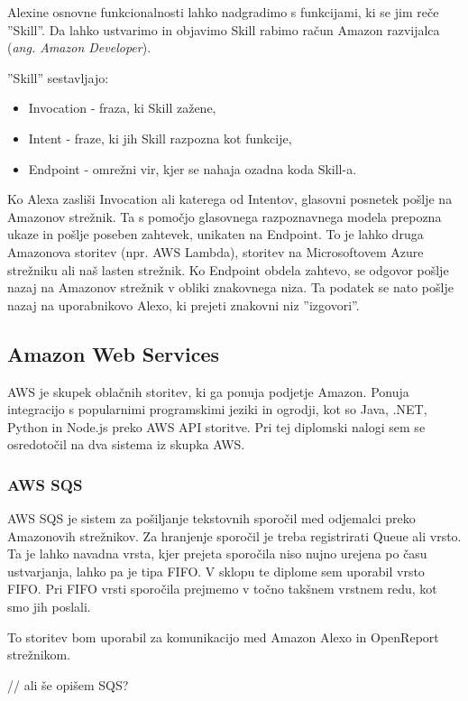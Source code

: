 \documentclass[a4paper, 12pt]{book}
\begin{document}
Alexine osnovne funkcionalnosti lahko nadgradimo s funkcijami, ki se jim reče ''Skill''.
Da lahko ustvarimo in objavimo Skill rabimo račun Amazon razvijalca (\textit{ang. Amazon Developer}).


''Skill'' sestavljajo:
\begin{itemize}
	\item Invocation - fraza, ki Skill zažene,
	\item Intent - fraze, ki jih Skill razpozna kot funkcije,
	\item Endpoint - omrežni vir, kjer se nahaja ozadna koda Skill-a.
\end{itemize}

Ko Alexa zasliši Invocation ali katerega od Intentov, glasovni posnetek pošlje na Amazonov strežnik.
Ta s pomočjo glasovnega razpoznavnega modela prepozna ukaze in pošlje poseben zahtevek, unikaten na Endpoint.
To je lahko druga Amazonova storitev (npr. AWS Lambda), storitev na Microsoftovem Azure strežniku ali naš lasten strežnik.
Ko Endpoint obdela zahtevo, se odgovor pošlje nazaj na Amazonov strežnik v obliki znakovnega niza.
Ta podatek se nato pošlje nazaj na uporabnikovo Alexo, ki prejeti znakovni niz ''izgovori''.

\subsection{Amazon Web Services}

AWS je skupek oblačnih storitev, ki ga ponuja podjetje Amazon.
Ponuja integracijo s popularnimi programskimi jeziki in ogrodji, kot so Java, .NET, Python in Node.js preko AWS API storitve.
Pri tej diplomski nalogi sem se osredotočil na dva sistema iz skupka AWS.

\subsubsection{AWS SQS}

AWS SQS je sistem za pošiljanje tekstovnih sporočil med odjemalci preko Amazonovih strežnikov.
Za hranjenje sporočil je treba registrirati Queue ali vrsto. 
Ta je lahko navadna vrsta, kjer prejeta sporočila niso nujno urejena po času ustvarjanja, lahko pa je tipa FIFO.
V sklopu te diplome sem uporabil vrsto FIFO.
Pri FIFO vrsti sporočila prejmemo v točno takšnem vrstnem redu, kot smo jih poslali.

To storitev bom uporabil za komunikacijo med Amazon Alexo in OpenReport strežnikom.

// ali še opišem SQS?
\end{document}
